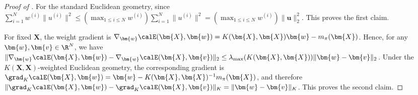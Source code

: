 \begin{proof}[Proof of ]
For the standard Euclidean geometry, since $\sum_{i=1}^Nw^{(i)}\|u^{(i)}\|^2
\leq
\left(\max_{1\leq i\leq N}w^{(i)}\right)
\sum_{i=1}^N\|u^{(i)}\|^2
=
\left(\max_{1\leq i\leq N}w^{(i)}\right)
\|\bm{u}\|_2^2$. 
This proves the first claim.

For fixed $\bm{X}$, the weight gradient is $\nabla_{\bm{w}}\calE(\bm{X},\bm{w})=K(\bm{X},\bm{X})\bm{w}-m_\pi(\bm{X})$. Hence, for any $\bm{w},\bm{v}\in\R^N$, we have $\|\nabla_{\bm{w}}\calE(\bm{X},\bm{w})-\nabla_{\bm{w}}\calE(\bm{X},\bm{v})\|_2\leq\lambda_{\max}(K(\bm{X},\bm{X}))\|\bm{w}-\bm{v}\|_2$. Under the $K(\bm{X},\bm{X})$-weighted Euclidean geometry, the corresponding gradient is $\grad_K\calE(\bm{X},\bm{w})=\bm{w}-K(\bm{X},\bm{X})^{-1}m_\pi(\bm{X})$, and therefore $\|\grad_K\calE(\bm{X},\bm{w})-\grad_K\calE(\bm{X},\bm{v})\|_K=\|\bm{w}-\bm{v}\|_K$. This proves the second claim.
\end{proof}


